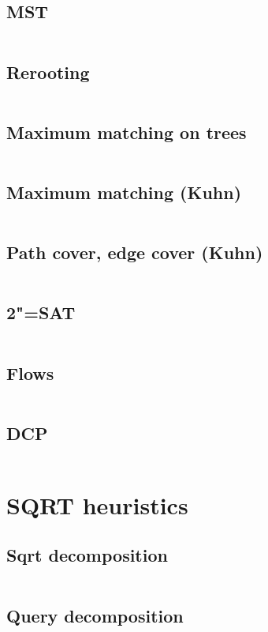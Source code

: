 ﻿\documentclass[10pt,twocolumn,oneside]{article}
\begin{document}
\subsection{MST}
\inputminted[breaklines]{cpp}{Graph algorithms/mst.cpp}
\subsection{Rerooting}
\inputminted[breaklines]{cpp}{Graph algorithms/rerooting.cpp}
\subsection{Maximum matching on trees}
\inputminted[breaklines]{cpp}{Graph algorithms/maximum matching on trees.cpp}
\subsection{Maximum matching (Kuhn)}
\inputminted[breaklines]{cpp}{Graph algorithms/kuhn (with optimizations).cpp}
\subsection{Path cover, edge cover (Kuhn)}
\inputminted[breaklines]{cpp}{Graph algorithms/path cover + edge cover (kuhn).cpp}
\subsection{2"=SAT}
\inputminted[breaklines]{cpp}{Graph algorithms/2-sat.cpp}
\subsection{Flows}
\inputminted[breaklines]{cpp}{Graph algorithms/flows.cpp}
\subsection{DCP}
\inputminted[breaklines]{cpp}{Graph algorithms/dcp.cpp}

\section{SQRT heuristics}
\subsection{Sqrt decomposition}
\inputminted[breaklines]{python}{SQRT heuristics/sqrt decomposition.py}
\subsection{Query decomposition}
\inputminted[breaklines]{cpp}{SQRT heuristics/query decomposition.cpp}
\end{document}
